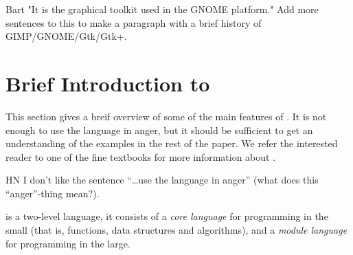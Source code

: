 \documentclass[workingdraft]{usetex-v1}
\begin{document}
\begin{ednote}{Bart}
     "It is the graphical toolkit used in the GNOME platform."  Add more
   sentences to this to make a paragraph with a brief history of
   GIMP/GNOME/Gtk/Gtk+.
\end{ednote}




\section{Brief Introduction to \sml{}}
\label{sec:brief-intr-sml}

This section gives a breif overview of some of the main features of
\sml{}.  It is not enough to use the language in anger, but it should
be sufficient to get an understanding of the examples in the rest of
the paper.  We refer the interested reader to one of the fine textbooks
\cite{Hansen-Rischel:1999,Paulson:1996} for more information about \sml{}.

\begin{ednote}{HN}
I don't like the sentence ``\ldots use the language in anger'' (what
does this ``anger''-thing mean?).
\end{ednote}

\sml{} is a two-level language, it consists of a \emph{core language}
for programming in the small (that is, functions, data structures and
algorithms), and a \emph{module language} for programming in the large.
\end{document}

